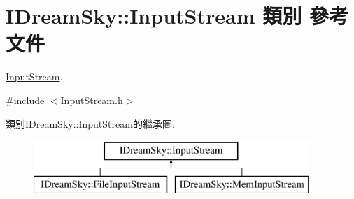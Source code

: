 \hypertarget{class_i_dream_sky_1_1_input_stream}{}\section{I\+Dream\+Sky\+:\+:Input\+Stream 類別 參考文件}
\label{class_i_dream_sky_1_1_input_stream}


\hyperlink{class_i_dream_sky_1_1_input_stream}{Input\+Stream}.  




{\ttfamily \#include $<$Input\+Stream.\+h$>$}

類別\+I\+Dream\+Sky\+:\+:Input\+Stream的繼承圖\+:\begin{figure}[H]
\begin{center}
\leavevmode
\includegraphics[height=2.000000cm]{class_i_dream_sky_1_1_input_stream}
\end{center}
\end{figure}
